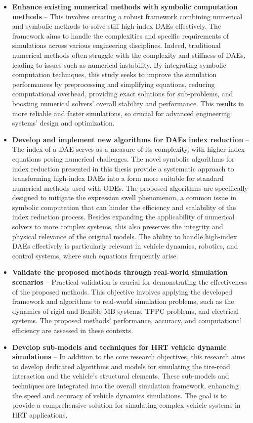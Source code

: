 \begin{itemize}
  \setlength\itemsep{0.0em}
  \item \textbf{Enhance existing numerical methods with symbolic computation methods} -- This involves creating a robust framework combining numerical and symbolic methods to solve stiff high-index \acp{DAE} effectively. The framework aims to handle the complexities and specific requirements of simulations across various engineering disciplines. Indeed, traditional numerical methods often struggle with the complexity and stiffness of \acp{DAE}, leading to issues such as numerical instability. By integrating symbolic computation techniques, this study seeks to improve the simulation performances by preprocessing and simplifying equations, reducing computational overhead, providing exact solutions for sub-problems, and boosting numerical solvers' overall stability and performance. This results in more reliable and faster simulations, so crucial for advanced engineering systems' design and optimization.
  \item \textbf{Develop and implement new algorithms for \acp{DAE} index reduction} -- The index of a \ac{DAE} serves as a measure of its complexity, with higher-index equations posing numerical challenges. The novel symbolic algorithms for index reduction presented in this thesis provide a systematic approach to transforming high-index \acp{DAE} into a form more suitable for standard numerical methods used with \acp{ODE}. The proposed algorithms are specifically designed to mitigate the expression swell phenomenon, a common issue in symbolic computation that can hinder the efficiency and scalability of the index reduction process. Besides expanding the applicability of numerical solvers to more complex systems, this also preserves the integrity and physical relevance of the original models. The ability to handle high-index \acp{DAE} effectively is particularly relevant in vehicle dynamics, robotics, and control systems, where such equations frequently arise.
  \item \textbf{Validate the proposed methods through real-world simulation scenarios} -- Practical validation is crucial for demonstrating the effectiveness of the proposed methods. This objective involves applying the developed framework and algorithms to real-world simulation problems, such as the dynamics of rigid and flexible \ac{MB} systems, \ac{TPPC} problems, and electrical systems. The proposed methods' performance, accuracy, and computational efficiency are assessed in these contexts.
  \item \textbf{Develop sub-models and techniques for \ac{HRT} vehicle dynamic simulations} -- In addition to the core research objectives, this research aims to develop dedicated algorithms and models for simulating the tire-road interaction and the vehicle's structural elements. These sub-models and techniques are integrated into the overall simulation framework, enhancing the speed and accuracy of vehicle dynamics simulations. The goal is to provide a comprehensive solution for simulating complex vehicle systems in \ac{HRT} applications.
\end{itemize}

